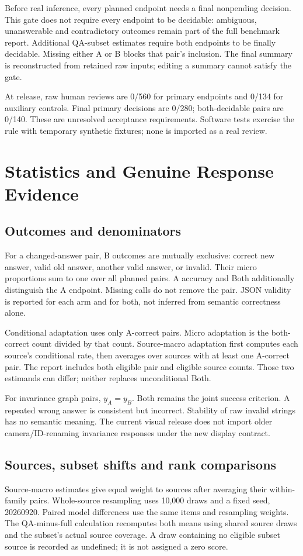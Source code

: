 \documentclass[10pt,twocolumn,letterpaper]{article}
\begin{document}
Before real inference, every planned endpoint needs a final nonpending
decision. This gate does not require every endpoint to be decidable:
ambiguous, unanswerable and contradictory outcomes remain part of
the full benchmark report. Additional QA-subset estimates require
both endpoints to be finally decidable. Missing either A or B blocks
that pair's inclusion. The final summary is reconstructed from retained
raw inputs; editing a summary cannot satisfy the gate.

At release, raw human reviews are 0/560 for primary endpoints and
0/134 for auxiliary controls. Final primary decisions are 0/280;
both-decidable pairs are 0/140. These are unresolved acceptance
requirements. Software tests exercise the rule with temporary
synthetic fixtures; none is imported as a real review.

\section{Statistics and Genuine Response Evidence}
\subsection{Outcomes and denominators}
For a changed-answer pair, B outcomes are mutually exclusive:
correct new answer, valid old answer, another valid answer, or invalid.
Their micro proportions sum to one over all planned pairs.
A accuracy and Both additionally distinguish the A endpoint.
Missing calls do not remove the pair. JSON validity is reported for
each arm and for both, not inferred from semantic correctness alone.

Conditional adaptation uses only A-correct pairs. Micro adaptation is
the both-correct count divided by that count. Source-macro adaptation
first computes each source's conditional rate, then averages over
sources with at least one A-correct pair. The report includes both
eligible pair and eligible source counts. Those two estimands can
differ; neither replaces unconditional Both.

For invariance graph pairs, $y_A=y_B$. Both remains the joint success
criterion. A repeated wrong answer is consistent but incorrect.
Stability of raw invalid strings has no semantic meaning. The current
visual release does not import older camera/ID-renaming invariance
responses under the new display contract.

\subsection{Sources, subset shifts and rank comparisons}
Source-macro estimates give equal weight to sources after averaging
their within-family pairs. Whole-source resampling uses 10,000 draws
and a fixed seed, 20260920. Paired model differences use the same
items and resampling weights. The QA-minus-full calculation recomputes
both means using shared source draws and the subset's actual source
coverage. A draw containing no eligible subset source is recorded
as undefined; it is not assigned a zero score.
\end{document}
